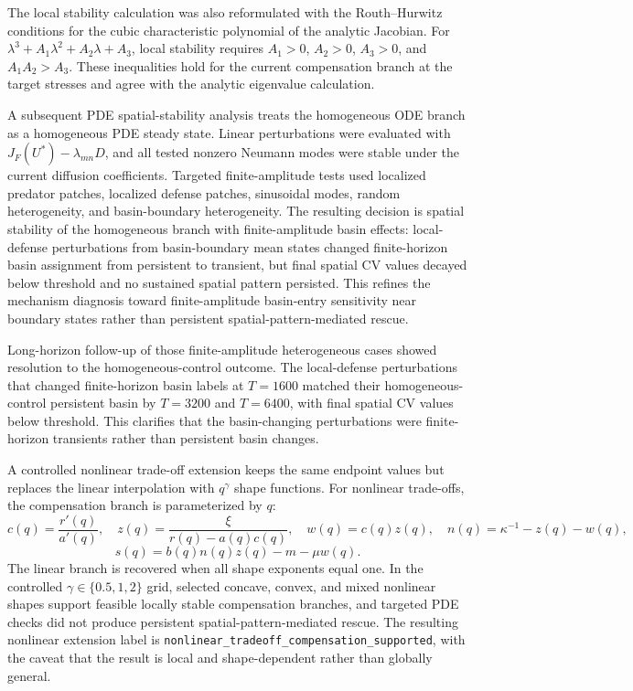 \documentclass[11pt]{article}
\begin{document}
The local stability calculation was also reformulated with the Routh--Hurwitz conditions for the cubic characteristic polynomial of the analytic Jacobian. For \(\lambda^3+A_1\lambda^2+A_2\lambda+A_3\), local stability requires \(A_1>0\), \(A_2>0\), \(A_3>0\), and \(A_1A_2>A_3\). These inequalities hold for the current compensation branch at the target stresses and agree with the analytic eigenvalue calculation.

A subsequent PDE spatial-stability analysis treats the homogeneous ODE branch as a homogeneous PDE steady state. Linear perturbations were evaluated with \(J_F(U^*)-\lambda_{mn}D\), and all tested nonzero Neumann modes were stable under the current diffusion coefficients. Targeted finite-amplitude tests used localized predator patches, localized defense patches, sinusoidal modes, random heterogeneity, and basin-boundary heterogeneity. The resulting decision is spatial stability of the homogeneous branch with finite-amplitude basin effects: local-defense perturbations from basin-boundary mean states changed finite-horizon basin assignment from persistent to transient, but final spatial CV values decayed below threshold and no sustained spatial pattern persisted. This refines the mechanism diagnosis toward finite-amplitude basin-entry sensitivity near boundary states rather than persistent spatial-pattern-mediated rescue.

Long-horizon follow-up of those finite-amplitude heterogeneous cases showed resolution to the homogeneous-control outcome. The local-defense perturbations that changed finite-horizon basin labels at \(T=1600\) matched their homogeneous-control persistent basin by \(T=3200\) and \(T=6400\), with final spatial CV values below threshold. This clarifies that the basin-changing perturbations were finite-horizon transients rather than persistent basin changes.

A controlled nonlinear trade-off extension keeps the same endpoint values but replaces the linear interpolation with \(q^\gamma\) shape functions. For nonlinear trade-offs, the compensation branch is parameterized by \(q\):
\[
c(q)=\frac{r'(q)}{a'(q)},\quad
z(q)=\frac{\xi}{r(q)-a(q)c(q)},\quad
w(q)=c(q)z(q),\quad
n(q)=\kappa^{-1}-z(q)-w(q),
\]
\[
s(q)=b(q)n(q)z(q)-m-\mu w(q).
\]
The linear branch is recovered when all shape exponents equal one. In the controlled \(\gamma\in\{0.5,1,2\}\) grid, selected concave, convex, and mixed nonlinear shapes support feasible locally stable compensation branches, and targeted PDE checks did not produce persistent spatial-pattern-mediated rescue. The resulting nonlinear extension label is \texttt{nonlinear\_tradeoff\_compensation\_supported}, with the caveat that the result is local and shape-dependent rather than globally general.
\end{document}
